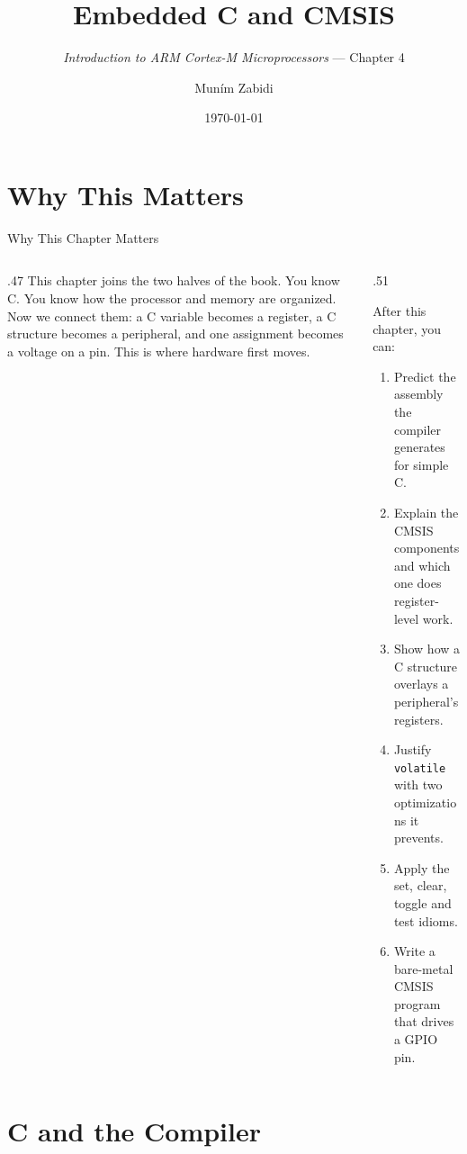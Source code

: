 \documentclass[9pt,aspectratio=169,xcolor=table]{beamer}
\title{Embedded C and CMSIS}
\subtitle{\emph{Introduction to ARM Cortex-M Microprocessors} --- Chapter 4}
\author{Mun\'{i}m Zabidi}
\institute{\color{primary}Faculty of Electrical Engineering, Universiti Teknologi Malaysia}
\date{\today}
\begin{document}
\titlepage

\section{Why This Matters}

\begin{frame}{Why This Chapter Matters}
    \begin{columns}[T]
    \begin{column}{.47\textwidth}
        {\normalsize This chapter joins the two halves of the book. You know C. You know how the processor and memory are organized. Now we connect them: a C variable becomes a register, a C structure becomes a peripheral, and one assignment becomes a voltage on a pin. This is where hardware first moves.}
    \end{column}
    \begin{column}{.51\textwidth}
        \begin{block}{After this chapter, you can:}
        {\small
        \begin{enumerate}\itemsep2pt
            \item Predict the assembly the compiler generates for simple C.
            \item Explain the CMSIS components and which one does register-level work.
            \item Show how a C structure overlays a peripheral's registers.
            \item Justify \texttt{volatile} with two optimizations it prevents.
            \item Apply the set, clear, toggle and test idioms.
            \item Write a bare-metal CMSIS program that drives a GPIO pin.
        \end{enumerate}}
        \end{block}
    \end{column}
    \end{columns}
\end{frame}


\section{C and the Compiler}
\end{document}
